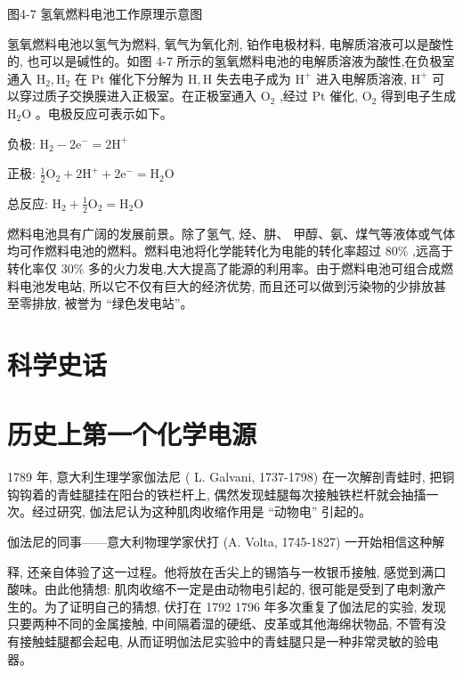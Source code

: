\documentclass[10pt]{article}
\begin{document}
图4-7 氢氧燃料电池工作原理示意图

氢氧燃料电池以氢气为燃料, 氧气为氧化剂, 铂作电极材料, 电解质溶液可以是酸性的, 也可以是碱性的。如图 4-7 所示的氢氧燃料电池的电解质溶液为酸性,在负极室通入 \({\mathrm{H}}_{2},{\mathrm{H}}_{2}\) 在 \(\mathrm{{Pt}}\) 催化下分解为 \(\mathrm{H},\mathrm{H}\) 失去电子成为 \({\mathrm{H}}^{ + }\) 进入电解质溶液, \({\mathrm{H}}^{ + }\) 可以穿过质子交换膜进入正极室。在正极室通入 \({\mathrm{O}}_{2}\) ,经过 \(\mathrm{{Pt}}\) 催化, \({\mathrm{O}}_{2}\) 得到电子生成 \({\mathrm{H}}_{2}\mathrm{O}\) 。电极反应可表示如下。

负极: \({\mathrm{H}}_{2} - 2{\mathrm{e}}^{ - } = 2{\mathrm{H}}^{ + }\)

正极: \(\frac{1}{2}{\mathrm{O}}_{2} + 2{\mathrm{H}}^{ + } + 2{\mathrm{e}}^{ - } = {\mathrm{H}}_{2}\mathrm{O}\)

总反应: \({\mathrm{H}}_{2} + \frac{1}{2}{\mathrm{O}}_{2} = {\mathrm{H}}_{2}\mathrm{O}\)

燃料电池具有广阔的发展前景。除了氢气, 烃、肼、 甲醇、氨、煤气等液体或气体均可作燃料电池的燃料。燃料电池将化学能转化为电能的转化率超过 \({80}\%\) ,远高于转化率仅 \({30}\%\) 多的火力发电,大大提高了能源的利用率。由于燃料电池可组合成燃料电池发电站, 所以它不仅有巨大的经济优势, 而且还可以做到污染物的少排放甚至零排放, 被誉为 “绿色发电站”。

\section*{科学史话}

\section*{历史上第一个化学电源}

1789 年, 意大利生理学家伽法尼 ( L. Galvani, 1737-1798) 在一次解剖青蛙时, 把铜钩钩着的青蛙腿挂在阳台的铁栏杆上, 偶然发现蛙腿每次接触铁栏杆就会抽搐一次。经过研究, 伽法尼认为这种肌肉收缩作用是 “动物电” 引起的。

伽法尼的同事——意大利物理学家伏打 (A. Volta, 1745-1827) 一开始相信这种解

释, 还亲自体验了这一过程。他将放在舌尖上的锡箔与一枚银币接触, 感觉到满口酸味。由此他猜想: 肌肉收缩不一定是由动物电引起的, 很可能是受到了电刺激产生的。为了证明自己的猜想, 伏打在 1792 1796 年多次重复了伽法尼的实验, 发现只要两种不同的金属接触, 中间隔着湿的硬纸、皮革或其他海绵状物品, 不管有没有接触蛙腿都会起电, 从而证明伽法尼实验中的青蛙腿只是一种非常灵敏的验电器。
\end{document}
